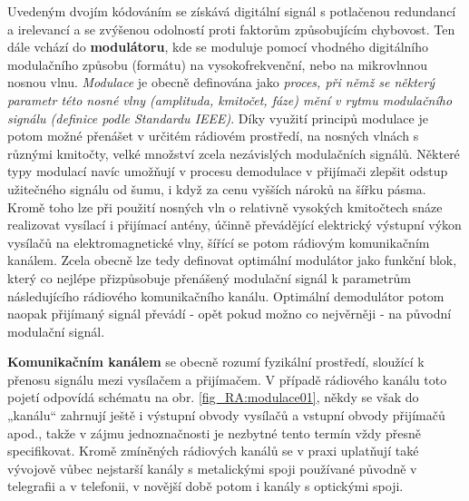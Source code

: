     Uvedeným dvojím kódováním se získává digitální signál s potlačenou redundancí a irelevancí a se 
    zvýšenou odolností proti faktorům způsobujícím chybovost. Ten dále vchází do 
    \textbf{modulátoru}, kde se moduluje pomocí vhodného digitálního modulačního způsobu (formátu) 
    na vysokofrekvenční, nebo na mikrovlnnou nosnou vlnu. \emph{Modulace} je obecně definována jako 
    \emph{proces, při němž se některý parametr této nosné vlny (amplituda, kmitočet, fáze) mění v 
    rytmu modulačního signálu (definice podle Standardu IEEE)}. Díky využití principů modulace je 
    potom možné přenášet v určitém rádiovém prostředí, na nosných vlnách s různými kmitočty, velké 
    množ\-ství zcela nezávislých modulačních signálů. Některé typy modulací navíc umožňují v 
    procesu demodulace v přijímači zlepšit odstup užitečného signálu od šumu, i když za cenu 
    vyšších nároků na šířku pásma. Kromě toho lze při použití nosných vln o relativně vysokých 
    kmitočtech snáze realizovat vysílací i přijímací antény, účinně převádějící elektrický výstupní 
    výkon vysílačů na elektromagnetické vlny, šířící se potom rádiovým komunikačním kanálem. Zcela 
    obecně lze tedy definovat optimální modulátor jako funkční blok, který co nejlépe přizpůsobuje 
    přenášený modulační signál k parametrům následujícího rádiového komunikačního kanálu. Optimální 
    demodulátor potom naopak přijímaný signál převádí - opět pokud možno co nejvěrněji - na původní 
    modulační signál.
    
    \textbf{Komunikačním kanálem} se obecně rozumí fyzikální pros\-tře\-dí, sloužící k přenosu 
    signálu mezi vysílačem a přijímačem. V případě rádiového kanálu toto pojetí odpovídá schématu 
    na obr. \ref{fig_RA:modulace01}, někdy se však do „kanálu“ zahrnují ještě i výstupní obvody 
    vysílačů a vstupní obvody přijímačů apod., takže v zájmu jednoznačnosti je nezbytné tento 
    termín vždy přesně specifikovat. Kromě zmíněných rádiových kanálů se v praxi uplatňují také 
    vývojově vůbec nejstarší kanály s metalickými spoji používané původně v telegrafii a v 
    telefonii, v novější době potom i kanály s optickými spoji.
    
